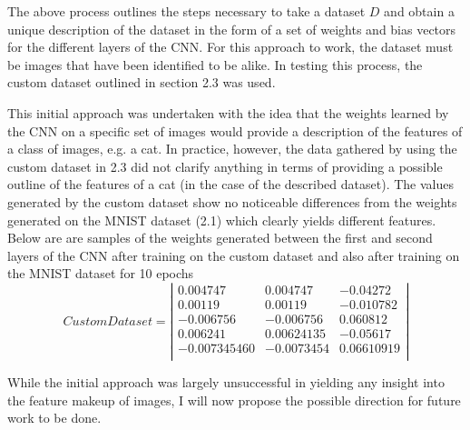 \documentclass[12pt, titlepage]{article}
\begin{document}
The above process outlines the steps necessary to take a dataset $D$ and obtain a unique description of the dataset in the
form of a set of weights and bias vectors for the different layers of the CNN. For this approach to work, the dataset must be
images that have been identified to be alike. In testing this process, the custom dataset outlined in section 2.3 was used.

This initial approach was undertaken with the idea that the weights learned by the CNN on a specific set of
images would provide a description of the features of a class of images, e.g. a cat. In practice, however, the
data gathered by using the custom dataset in 2.3 did not clarify anything in terms of providing a possible
outline of the features of a cat (in the case of the described dataset). The values generated by the custom dataset
show no noticeable differences from the weights generated on the MNIST dataset (2.1) which clearly yields
different features. Below are are samples of the weights generated between the first and second layers of the CNN
after training on the custom dataset and also after training on the MNIST dataset for 10 epochs \\

\[Custom Dataset = \left| \begin{array}{cccccccccc}
0.004747 & 0.004747 & -0.04272\\
0.00119 & 0.00119 & -0.010782\\
-0.006756 & -0.006756 & 0.060812\\
0.006241 & 0.00624135 & -0.05617\\
-0.007345460 & -0.0073454 & 0.06610919\\
\end{array} \right| \]



While the initial approach was largely unsuccessful in yielding any insight into the feature makeup of images, I will now propose the possible
direction for future work to be done.
\end{document}
